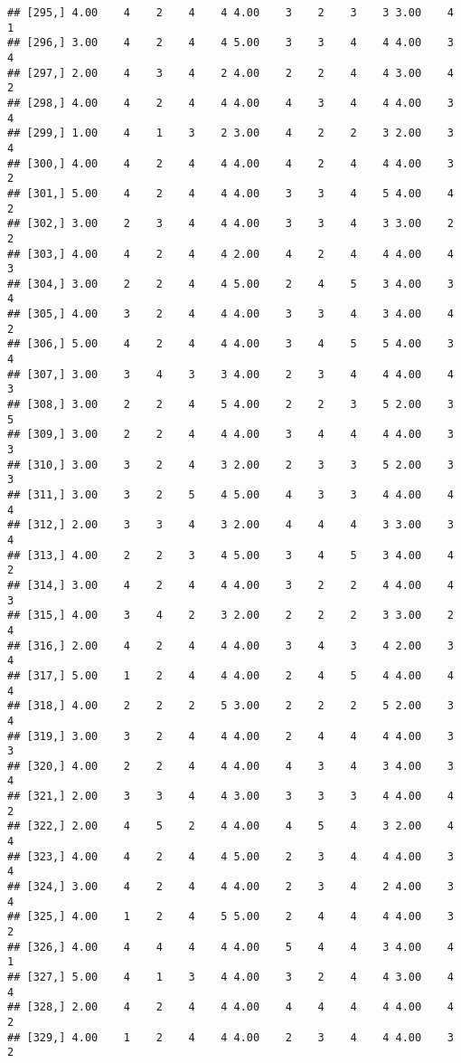 \documentclass[]{article}
\begin{document}
\begin{verbatim}
## [295,] 4.00    4    2    4    4 4.00    3    2    3    3 3.00    4    1
## [296,] 3.00    4    2    4    4 5.00    3    3    4    4 4.00    3    4
## [297,] 2.00    4    3    4    2 4.00    2    2    4    4 3.00    4    2
## [298,] 4.00    4    2    4    4 4.00    4    3    4    4 4.00    3    4
## [299,] 1.00    4    1    3    2 3.00    4    2    2    3 2.00    3    4
## [300,] 4.00    4    2    4    4 4.00    4    2    4    4 4.00    3    2
## [301,] 5.00    4    2    4    4 4.00    3    3    4    5 4.00    4    2
## [302,] 3.00    2    3    4    4 4.00    3    3    4    3 3.00    2    2
## [303,] 4.00    4    2    4    4 2.00    4    2    4    4 4.00    4    3
## [304,] 3.00    2    2    4    4 5.00    2    4    5    3 4.00    3    4
## [305,] 4.00    3    2    4    4 4.00    3    3    4    3 4.00    4    2
## [306,] 5.00    4    2    4    4 4.00    3    4    5    5 4.00    3    4
## [307,] 3.00    3    4    3    3 4.00    2    3    4    4 4.00    4    3
## [308,] 3.00    2    2    4    5 4.00    2    2    3    5 2.00    3    5
## [309,] 3.00    2    2    4    4 4.00    3    4    4    4 4.00    3    3
## [310,] 3.00    3    2    4    3 2.00    2    3    3    5 2.00    3    3
## [311,] 3.00    3    2    5    4 5.00    4    3    3    4 4.00    4    4
## [312,] 2.00    3    3    4    3 2.00    4    4    4    3 3.00    3    4
## [313,] 4.00    2    2    3    4 5.00    3    4    5    3 4.00    4    2
## [314,] 3.00    4    2    4    4 4.00    3    2    2    4 4.00    4    3
## [315,] 4.00    3    4    2    3 2.00    2    2    2    3 3.00    2    4
## [316,] 2.00    4    2    4    4 4.00    3    4    3    4 2.00    3    4
## [317,] 5.00    1    2    4    4 4.00    2    4    5    4 4.00    4    4
## [318,] 4.00    2    2    2    5 3.00    2    2    2    5 2.00    3    4
## [319,] 3.00    3    2    4    4 4.00    2    4    4    4 4.00    3    3
## [320,] 4.00    2    2    4    4 4.00    4    3    4    3 4.00    3    4
## [321,] 2.00    3    3    4    4 3.00    3    3    3    4 4.00    4    2
## [322,] 2.00    4    5    2    4 4.00    4    5    4    3 2.00    4    4
## [323,] 4.00    4    2    4    4 5.00    2    3    4    4 4.00    3    4
## [324,] 3.00    4    2    4    4 4.00    2    3    4    2 4.00    3    4
## [325,] 4.00    1    2    4    5 5.00    2    4    4    4 4.00    3    2
## [326,] 4.00    4    4    4    4 4.00    5    4    4    3 4.00    4    1
## [327,] 5.00    4    1    3    4 4.00    3    2    4    4 3.00    4    4
## [328,] 2.00    4    2    4    4 4.00    4    4    4    4 4.00    4    2
## [329,] 4.00    1    2    4    4 4.00    2    3    4    4 4.00    3    2

\end{verbatim}
\end{document}

